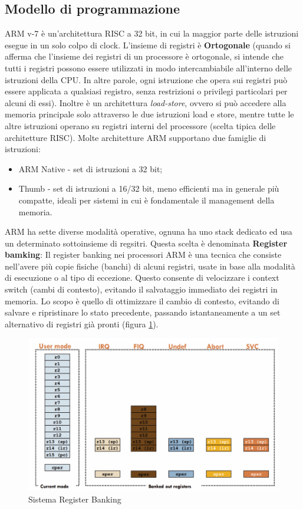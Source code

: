 \subsection{Modello di programmazione}
ARM v-7 è un'architettura RISC a 32 bit, in cui la maggior parte delle istruzioni esegue in un solo colpo di clock. L'insieme di registri è \textbf{Ortogonale} (quando si afferma che l'insieme dei registri di un processore è ortogonale, si intende che tutti i registri possono essere utilizzati in modo intercambiabile all'interno delle istruzioni della CPU. In altre parole, ogni istruzione che opera sui registri può essere applicata a qualsiasi registro, senza restrizioni o privilegi particolari per alcuni di essi). Inoltre è un architettura \textit{load-store}, ovvero si può accedere alla memoria principale solo attraverso le due istruzioni load e store, mentre tutte le altre istruzioni operano su registri interni del processore (scelta tipica delle architetture RISC). 
Molte architetture ARM supportano due famiglie di istruzioni:
\begin{itemize}
    \item ARM Native - set di istruzioni a 32 bit;
    \item Thumb - set di istruzioni a 16/32 bit, meno efficienti ma in generale più compatte, ideali per sistemi in cui è fondamentale il management della memoria. 
\end{itemize}

ARM ha sette diverse modalità operative, ognuna ha uno stack dedicato ed usa un determinato sottoinsieme di regsitri. Questa scelta è denominata \textbf{Register bamking}: Il register banking nei processori ARM è una tecnica che consiste nell’avere più copie fisiche (banchi) di alcuni registri, usate in base alla modalità di esecuzione o al tipo di eccezione. Questo consente di velocizzare i context switch (cambi di contesto), evitando il salvataggio immediato dei registri in memoria. Lo scopo è quello di ottimizzare il cambio di contesto, evitando di salvare e ripristinare lo stato precedente, passando istantaneamente a un set alternativo di registri già pronti (figura \ref{img:register_banking}).

\begin{figure}[h!]
    \centering
    \includegraphics[width=.7\textwidth]{img/register_banking.png}
    \caption{Sistema Register Banking}
    \label{img:register_banking}

\end{figure}

